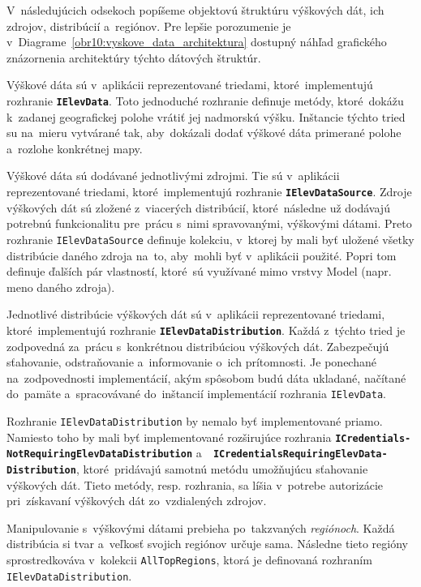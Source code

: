 V~následujúcich odsekoch popíšeme objektovú štruktúru výškových dát, ich zdrojov, distribúcií a~regiónov. Pre lepšie porozumenie je v~Diagrame~\ref{obr10:vyskove_data_architektura} dostupný náhľad  grafického znázornenia architektúry týchto dátových štruktúr.   

\bigskip

Výškové dáta sú v~aplikácii reprezentované triedami, ktoré~implementujú rozhranie \textbf{\texttt{IElevData}}. Toto jednoduché rozhranie definuje metódy, ktoré~dokážu k~zadanej geografickej polohe vrátiť jej nadmorskú výšku. Inštancie týchto tried su na~mieru vytvárané tak, aby~dokázali dodať výškové dáta primerané polohe a~rozlohe konkrétnej mapy. 

Výškové dáta sú dodávané jednotlivými zdrojmi. Tie sú v~aplikácii reprezentované triedami, ktoré~implementujú rozhranie \textbf{\texttt{IElevDataSource}}. Zdroje výškových dát sú zložené z~viacerých distribúcií, ktoré~následne už dodávajú potrebnú funkcionalitu pre~prácu s~nimi spravovanými, výškovými dátami. Preto rozhranie \texttt{IElevDataSource} definuje kolekciu, v~ktorej by mali byť uložené všetky distribúcie daného zdroja na~to, aby~mohli byť v~aplikácii použité. Popri tom definuje ďalších pár vlastností, ktoré~sú využívané mimo vrstvy Model (napr. meno daného zdroja).

Jednotlivé distribúcie výškových dát sú v~aplikácii reprezentované triedami, ktoré~implementujú rozhranie \textbf{\texttt{IElevDataDistribution}}. Každá z~týchto tried je zodpovedná za~prácu s~konkrétnou distribúciou výškových dát. Zabezpečujú sťahovanie, odstraňovanie a~informovanie o~ich prítomnosti. Je ponechané na~zodpovednosti implementácií, akým spôsobom budú dáta ukladané, načítané do~pamäte a~spracovávané do~inštancií implementácií rozhrania \texttt{IElevData}.

Rozhranie \texttt{IElevDataDistribution} by nemalo byť implementované priamo. Namiesto toho by mali byť implementované rozširujúce rozhrania \textbf{\texttt{ICredentials-} \texttt{NotRequiringElevDataDistribution}} a~\textbf{\texttt{ ICredentialsRequiringElevData- } \texttt{Distribution}},  ktoré~pridávajú samotnú metódu umožňujúcu sťahovanie výškových dát. Tieto metódy, resp. rozhrania, sa líšia v~potrebe autorizácie pri~získavaní výškových dát zo~vzdialených zdrojov.  

Manipulovanie s~výškovými dátami prebieha po~takzvaných \textit{regiónoch}. Každá distribúcia si tvar a~veľkosť svojich regiónov určuje sama. Následne tieto regióny sprostredkováva v~kolekcii \texttt{AllTopRegions}, ktorá je definovaná rozhraním \texttt{IElevDataDistribution}.

